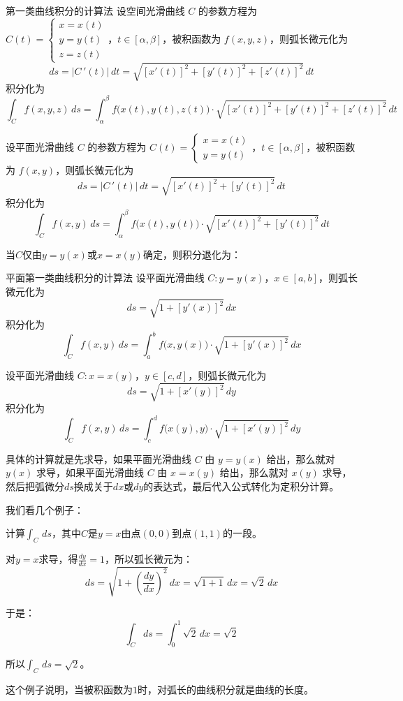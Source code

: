 \begin{theorem}{第一类曲线积分的计算法}{}
设空间光滑曲线 \( C \) 的参数方程为  
\(
C(t) = \begin{cases}
x = x(t)\\
y = y(t)\\
z = z(t)
\end{cases}\)，\(t \in [\alpha, \beta]\)，被积函数为 \(f(x,y,z)\)，则弧长微元化为
\[
ds = |C\,'(t)|\,dt = \sqrt{[x'(t)]^2 + [y'(t)]^2 + [z'(t)]^2}\,dt
\]
积分化为
\[
\int_C f(x,y,z)\,ds = \int_{\alpha}^{\beta} f\big(x(t),y(t),z(t)\big) \cdot \sqrt{[x'(t)]^2 + [y'(t)]^2 + [z'(t)]^2}\,dt
\]

设平面光滑曲线 \( C \) 的参数方程为  
\(
C(t) = \begin{cases}
x = x(t)\\
y = y(t)
\end{cases}\)，\(t \in [\alpha, \beta]\)，被积函数为 \(f(x,y)\)，则弧长微元化为
\[
ds = |C\,'(t)|\,dt = \sqrt{[x'(t)]^2 + [y'(t)]^2}\,dt
\]
积分化为
\[
\int_C f(x,y)\,ds = \int_{\alpha}^{\beta} f\big(x(t),y(t)\big) \cdot \sqrt{[x'(t)]^2 + [y'(t)]^2}\,dt
\]
\end{theorem}

当\(C\)仅由\(y = y(x)\)或\(x = x(y)\)确定，则积分退化为：

\begin{theorem}{平面第一类曲线积分的计算法}{}
设平面光滑曲线 \( C:y=y(x) \)，\(x \in [a,b]\)，则弧长微元化为
\[
ds = \sqrt{1 + [y'(x)]^2}\,dx
\]
积分化为
\[
\int_C f(x,y)\,ds = \int_{a}^{b} f\big(x,y(x)\big) \cdot \sqrt{1 + [y'(x)]^2}\,dx
\]

设平面光滑曲线 \( C:x=x(y) \)，\(y \in [c,d]\)，则弧长微元化为
\[
ds = \sqrt{1 + [x'(y)]^2}\,dy
\]
积分化为
\[
\int_C f(x,y)\,ds = \int_{c}^{d} f\big(x(y),y\big) \cdot \sqrt{1 + [x'(y)]^2}\,dy
\]
\end{theorem}

具体的计算就是先求导，如果平面光滑曲线 \(C\) 由 \(y = y(x)\) 给出，那么就对 \(y(x)\) 求导，如果平面光滑曲线 \(C\) 由 \(x = x(y)\) 给出，那么就对 \(x(y)\) 求导，然后把弧微分\(ds\)换成关于\(dx\)或\(dy\)的表达式，最后代入公式转化为定积分计算。

我们看几个例子：

\begin{myexample}
计算\(\int_C \,ds\)，其中\(C\)是\(y=x\)由点\((0,0)\)到点\((1,1)\)的一段。

对\(y = x\)求导，得\(\frac{dy}{dx} = 1\)，所以弧长微元为：
\[
ds = \sqrt{1 + \left(\frac{dy}{dx}\right)^2}\,dx = \sqrt{1+1}\,dx = \sqrt{2}\,dx
\]

于是：
\[
\int_C ds = \int_0^1 \sqrt{2}\,dx = \sqrt{2}
\]

所以\(\int_C \,ds = \sqrt{2}\)。
\end{myexample}
这个例子说明，当被积函数为$1$时，对弧长的曲线积分就是曲线的长度。

